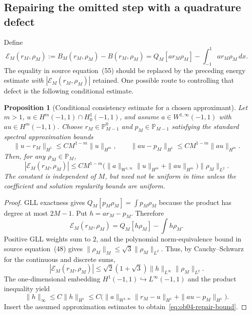 \documentclass[11pt,a4paper]{amsart}
\theoremstyle{remark}
\theoremstyle{plain}
\newtheorem{proposition}{Proposition}[section]
\theoremstyle{remark}
\numberwithin{equation}{section}
\begin{document}
\subsection{Repairing the omitted step with a quadrature defect}
Define
\begin{equation}\label{eq:ob04-defect}
 \mathcal E_M(r_M,\rho_M):=B_M(r_M,\rho_M)-B(r_M,\rho_M)
 =Q_M[a r_M\rho_M]-\int_{-1}^1 a r_M\rho_M\,dx.
\end{equation}
The equality in source equation~(55) should be replaced by the preceding energy estimate \emph{with} $|\mathcal E_M(r_M,\rho_M)|$ retained. One possible route to controlling that defect is the following conditional estimate.

\begin{proposition}[Conditional consistency estimate for a chosen approximant]\label{prop:ob04-repair}
Let $m>1$, $u\in H^m(-1,1)\cap H_0^1(-1,1)$, and assume $a\in W^{1,\infty}(-1,1)$ with $au\in H^m(-1,1)$. Choose $r_M\in\mathbb P^0_{M-1}$ and $p_M\in\mathbb P_{M-1}$ satisfying the standard spectral approximation bounds
\[
 \|u-r_M\|_{H^1}\le C M^{1-m}\|u\|_{H^m},\qquad
 \|au-p_M\|_{H^1}\le C M^{1-m}\|au\|_{H^m}.
\]
Then, for any $\rho_M\in\mathbb P_M$,
\begin{equation}\label{eq:ob04-repair-bound}
 |\mathcal E_M(r_M,\rho_M)|\le
 C M^{1-m}\bigl(\|a\|_{W^{1,\infty}}\|u\|_{H^m}
 +\|au\|_{H^m}\bigr)\|\rho_M\|_{L^2}.
\end{equation}
The constant is independent of $M$, but need not be uniform in time unless the coefficient and solution regularity bounds are uniform.
\end{proposition}
\begin{proof}
GLL exactness gives $Q_M[p_M\rho_M]=\int p_M\rho_M$ because the product has degree at most $2M-1$. Put $h=a r_M-p_M$. Therefore
\[
 \mathcal E_M(r_M,\rho_M)=Q_M[h\rho_M]-\int h\rho_M.
\]
Positive GLL weights sum to $2$, and the polynomial norm-equivalence bound in source equation~(48) gives $\|\rho_M\|_M\le\sqrt3\|\rho_M\|_{L^2}$. Thus, by Cauchy--Schwarz for the continuous and discrete sums,
\[
 |\mathcal E_M(r_M,\rho_M)|\le
 \sqrt2(1+\sqrt3)\|h\|_{L^\infty}\|\rho_M\|_{L^2}.
\]
The one-dimensional embedding $H^1(-1,1)\hookrightarrow L^\infty(-1,1)$ and the product inequality yield
\[
 \|h\|_\infty\le C\|h\|_{H^1}\le
 C\bigl(\|a\|_{W^{1,\infty}}\|r_M-u\|_{H^1}
 +\|au-p_M\|_{H^1}\bigr).
\]
Insert the assumed approximation estimates to obtain~\eqref{eq:ob04-repair-bound}.
\end{proof}
\end{document}
